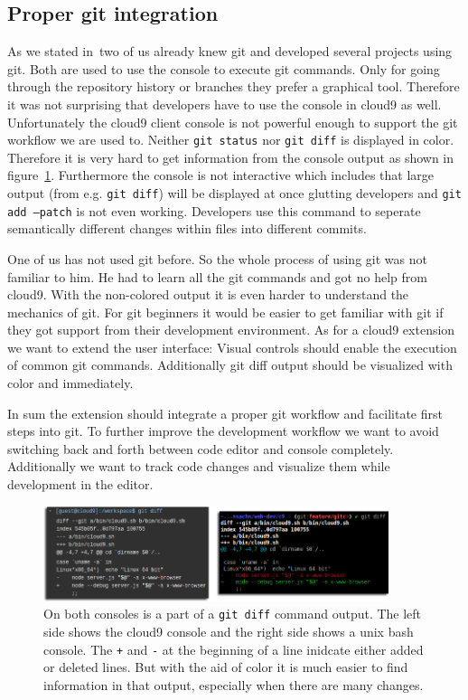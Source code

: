 \subsection{Proper git integration}
\label{subsec:ext_git_integration}
As we stated in~ two of us already knew git and developed several projects using git.
Both are used to use the console to execute git commands. Only for going through the repository history or branches they prefer a graphical tool.
Therefore it was not surprising that developers have to use the console in cloud9 as well.
Unfortunately the cloud9 client console is not powerful enough to support the git workflow we are used to.
Neither \texttt{git status} nor \texttt{git diff} is displayed in color.
Therefore it is very hard to get information from the console output as shown in figure~\ref{fig:diff_output}.
Furthermore the console is not interactive which includes that large output (from e.g. \texttt{git diff}) will be displayed at once glutting developers and \texttt{git add --patch} is not even working.
Developers use this command to seperate semantically different changes within files into different commits.

One of us has not used git before.
So the whole process of using git was not familiar to him.
He had to learn all the git commands and got no help from cloud9.
With the non-colored output it is even harder to understand the mechanics of git.
For git beginners it would be easier to get familiar with git if they got support from their development environment.
As for a cloud9 extension we want to extend the user interface: 
Visual controls should enable the execution of common git commands.
Additionally git diff output should be visualized with color and immediately.

In sum the extension should integrate a proper git workflow and facilitate first steps into git.
To further improve the development workflow we want to avoid switching back and forth between code editor and console completely.
Additionally we want to track code changes and visualize them while development in the editor.

\begin{figure}
   \centering
   \includegraphics[width=0.9\textwidth]{images/diff_output.png}
   \caption{On both consoles is a part of a \texttt{git diff} command output.
   The left side shows the cloud9 console and the right side shows a unix bash console.
   The \texttt{+} and \texttt{-} at the beginning of a line inidcate either added or deleted lines.
   But with the aid of color it is much easier to find information in that output, especially when there are many changes.}
   \label{fig:diff_output}
\end{figure}


